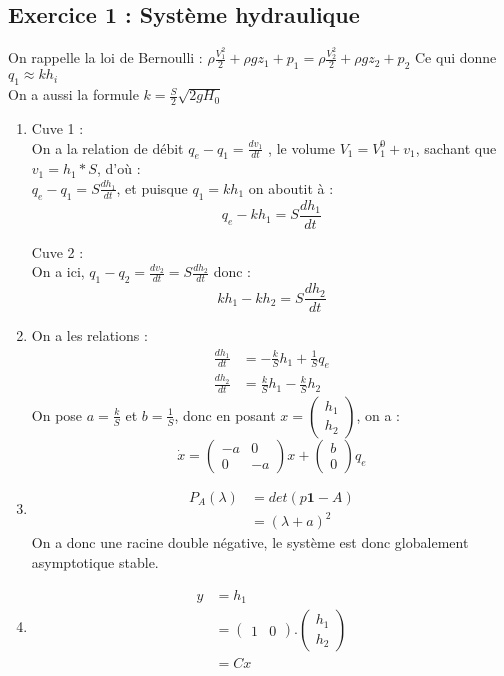 \documentclass[../main.tex]{subfiles}
\begin{document}
\subsection*{Exercice 1 : Système hydraulique}
On rappelle la loi de Bernoulli : $\rho \frac{V_1^2}{2} + \rho g z_1 +p_1 = \rho \frac{V_2^2}{2} + \rho g z_2 +p_2$ Ce qui donne $q_1 \approx k h_i$\\
On a aussi la formule $k = \frac{S}{2} \sqrt{2gH_0}$ \\

\begin{enumerate}
\item  Cuve 1 :\\
On a la relation de débit $q_e - q_1 = \frac{dv_1}{dt}$ , le volume $V_1 = V_1^0+v_1$, sachant que $v_1 = h_1 * S$, d'où :\\
$q_e -q_1 = S \frac{dh_1}{dt}$, et puisque $q_1 = kh_1$ on aboutit à :
\[ q_e- kh_1 = S\frac{dh_1}{dt}\]

 Cuve 2 :\\
On a ici, $q_1-q_2 = \frac{dv_2}{dt} = S\frac{dh_2}{dt}$ donc :
\[kh_1 - kh_2 = S\frac{dh_2}{dt}\]

\item On a les relations :
\begin{align*}
\frac{dh_1}{dt} &= - \frac{k}{S}h_1 + \frac{1}{S}q_e\\
\frac{dh_2}{dt} &= \frac{k}{S}h_1- \frac{k}{S}h_2
\end{align*}
On pose $a= \frac{k}{S}$ et $b = \frac{1}{S}$, donc en posant $x= \begin{pmatrix}h_1\\h_2\end{pmatrix}$, on a :
\[\dot{x} = \begin{pmatrix}-a & 0 \\ 0 & -a\end{pmatrix}x + \begin{pmatrix}b\\0\end{pmatrix} q_e\]

\item \begin{align*}
P_A(\lambda) &= det(p \mathbf{1}-A)\\
&= (\lambda + a )^2
\end{align*}
On a donc une racine double négative, le système est donc globalement asymptotique stable.\\

\item \begin{align*}
y &= h_1\\
&= \begin{pmatrix}1&0\end{pmatrix}. \begin{pmatrix}h_1\\h_2\end{pmatrix}\\
&= Cx
\end{align*}


\end{enumerate}
\end{document}
